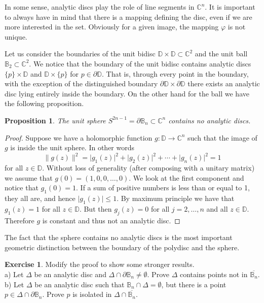 \documentclass[12pt,openany]{book}
\newcommand{\sabs}[1]{\lvert {#1} \rvert}
\newcommand{\snorm}[1]{\lVert {#1} \rVert}
\newcommand{\C}{{\mathbb{C}}}
\newcommand{\D}{{\mathbb{D}}}
\newcommand{\bB}{{\mathbb{B}}}
\newcommand{\bD}{{\mathbb{D}}}
\theoremstyle{plain}
\newtheorem{prop}[thm]{Proposition}
\theoremstyle{remark}
\theoremstyle{definition}
\newenvironment{exbox}{%
    \def\FrameCommand{\vrule width 1pt \relax\hspace {10pt}}%
    \MakeFramed {\advance \hsize -\width \FrameRestore }%
}{%
    \endMakeFramed
}
\theoremstyle{exercise}
\newtheorem{exercise}{Exercise}[section]
\theoremstyle{example}
\begin{document}
In some sense, analytic discs play the role of line segments in $\C^n$.  It
is important to always have in mind that there is a mapping defining the
disc, even if we are more interested in the set.  Obviously for a given
image, the mapping $\varphi$ is not unique.

Let us consider the boundaries of 
the unit bidisc $\bD \times \bD \subset \C^2$
and the unit ball $\bB_2 \subset \C^2$.  We notice that the boundary
of the unit bidisc contains analytic discs $\{p\} \times \bD$
and $\bD \times \{p\}$ for $p \in \partial \bD$.  That is, through
every point in the boundary, with the exception of the distinguished
boundary $\partial \D \times \partial \D$ there exists an analytic disc
lying entirely inside the boundary.  On the other hand for the ball
we have the following proposition.

\begin{prop}
The unit sphere $S^{2n-1} = \partial \bB_n \subset \C^n$ 
contains no analytic discs.
\end{prop}

\begin{proof}
Suppose we have a holomorphic function $g \colon \D \to \C^n$
such that the image of $g$ is inside the unit sphere.  In other words
\begin{equation*}
\snorm{g(z)}^2 = \sabs{g_1(z)}^2 + \sabs{g_2(z)}^2 + \cdots + \sabs{g_n(z)}^2 = 1
\end{equation*}
for all $z \in \D$.  Without loss of generality (after composing with a
unitary matrix) we assume that
$g(0) = (1,0,0,\ldots,0)$.  We look at the first component
and notice that $g_1(0) = 1$.  If a sum of
positive numbers is less than or equal to 1,
they all are, and hence $\sabs{g_1(z)} \leq 1$.  By maximum principle
we have that $g_1(z) = 1$ for all $z \in \D$.  But then $g_j(z) = 0$
for all $j=2,\ldots,n$ and all $z \in \D$.  Therefore $g$ is constant and
thus not an analytic disc.
\end{proof}

The fact that the sphere contains no analytic discs
is the most important geometric distinction between the boundary of
the polydisc and the sphere.

\begin{exbox}
\begin{exercise}
Modify the proof to show some stronger results.\\
a) Let $\Delta$ be an analytic disc
and $\Delta \cap \partial \bB_n \not= \emptyset$.
Prove $\Delta$ contains points not in
$\overline{\bB_n}$.\\
b) Let $\Delta$ be an analytic disc such that $\bB_n \cap \Delta =
\emptyset$, but there is a point $p \in \Delta \cap \partial \bB_n$.  Prove
$p$ is isolated in $\Delta \cap \overline{\bB_n}$.
\end{exercise}
\end{exbox}
\end{document}
